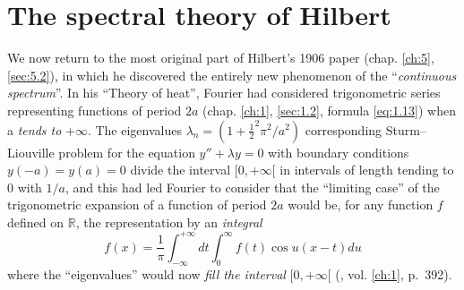 \documentclass[12pt,a4paper,leqno,twoside]{extbook}
\newcommand{\R}{\mathbb{R}}
\begin{document}
\section{The spectral theory of Hilbert}
\label{sec:7.2}

We now return to the most original part of Hilbert's 1906 paper (chap. \ref{ch:5}, \ref{sec:5.2}), in which he discovered the entirely new phenomenon of the ``\emph{continuous spectrum}''. In his ``Theory of heat'', Fourier had considered trigonometric series representing functions of period \(2a\) (chap. \ref{ch:1}, \ref{sec:1.2}, formula \eqref{eq:1.13}) when a \emph{tends to} \(+\infty\). The eigenvalues \(\lambda_n = \left( 1 + \frac{1}{2}^2 \pi^2 / a^2 \right)\) corresponding Sturm--Liouville problem for the equation \(y'' + \lambda y = 0\) with boundary conditions \(y(-a) = y(a) = 0\) divide the interval \([0,+\infty[\) in intervals of length tending to \(0\) with \(1/a\), and this had led Fourier to consider that the ``limiting case'' of the trigonometric expansion of a function of period \(2a\) would be, for any function \(f\) defined on \(\R\), the representation by an \emph{integral}
\begin{equation}
    \label{eq:7.1}
    f(x) = \frac{1}{\pi} \int_{-\infty}^{+\infty} dt \int_0^\infty f(t) \cos{u(x-t)}du
\end{equation}
where the ``eigenvalues'' would now \emph{fill the interval} \([0, +\infty[\) (\cite{067}, vol. \ref{ch:1}, p.~392).
\end{document}

